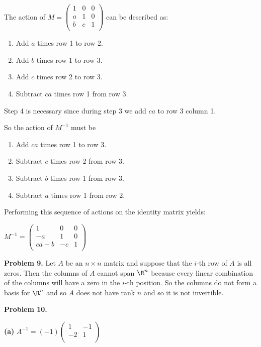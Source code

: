 \documentclass[oneside,12pt]{amsart}
\begin{document}
The action of
$
M=
\begin{pmatrix}
1 & 0  & 0 \\
a & 1  & 0 \\
b & c  & 1\\
\end{pmatrix}
$
can be described as:
\begin{enumerate}
\item Add $a$ times row 1 to row 2.
\item Add $b$ times row 1 to row 3.
\item Add $c$ times row 2 to row 3.
\item Subtract $ca$ times row 1 from row 3.
\end{enumerate}

Step 4 is necessary since during step 3 we add $ca$ to row 3 column 1.

So the action of $M^{-1}$ must be
\begin{enumerate}
\item Add $ca$ times row 1 to row 3.
\item Subtract $c$ times row 2 from row 3.
\item Subtract $b$ times row 1 from row 3.
\item Subtract $a$ times row 1 from row 2.
\end{enumerate}

Performing this sequence of actions on the identity matrix yields:

$
M^{-1}=
\begin{pmatrix}
1      &  0  & 0 \\
-a      &  1  & 0 \\
ca - b & -c  & 1\\
\end{pmatrix}
$

\bigskip

\textbf{Problem 9.} Let $A$ be an $n\times n$ matrix and suppose that the
$i$-th row of $A$ is all zeros. Then the columns of $A$ cannot span
$\R^n$ because every linear combination of the columns will have a zero
in the $i$-th position. So the columns do not form a basis for $\R^n$ and
so $A$ does not have rank $n$ and so it is not invertible.

\bigskip

\textbf{Problem 10.}

\textbf{(a)}
$
A^{-1}=
(-1)
\begin{pmatrix}
1 & -1 \\
-2 & 1 \\
\end{pmatrix}
$
\end{document}
